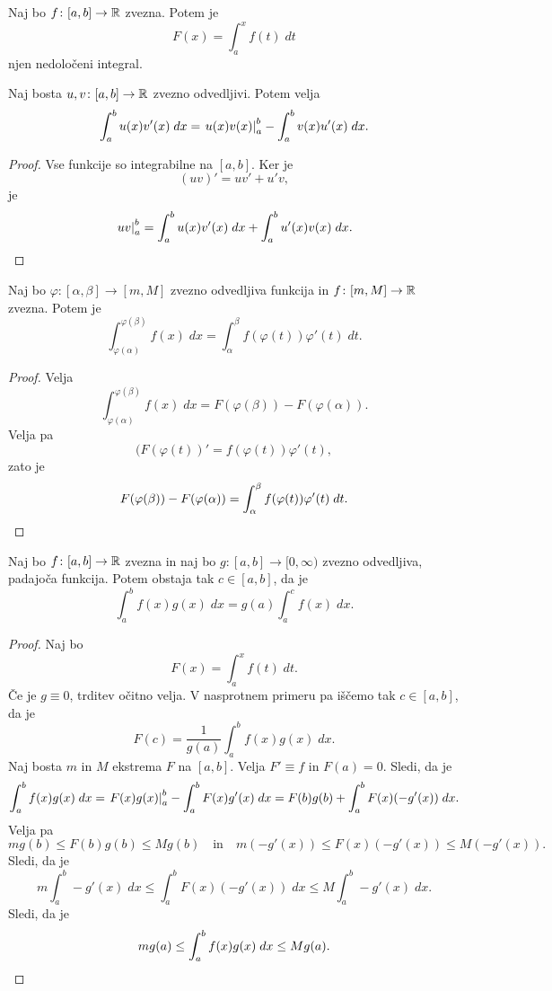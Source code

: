 \documentclass[12pt, a4paper]{article}
\begin{document}
\begin{posledica}
Naj bo $f\colon[a,b]\to\mathbb{R}$ zvezna. Potem je
\[
F(x)=\int_a^x f(t)\;dt
\]
njen nedoločeni integral.
\end{posledica}

\begin{trditev}
Naj bosta $u,v\colon[a,b]\to\mathbb{R}$ zvezno odvedljivi. Potem velja
\[
\int_a^b u(x)v'(x)\;dx=\left. u(x)v(x)\right|_{a}^{b}-\int_a^b v(x)u'(x)\;dx.
\]
\end{trditev}

\begin{proof}
Vse funkcije so integrabilne na $[a,b]$. Ker je
\[
(uv)'=uv'+u'v,
\]
je
\[
\left. uv\right|_{a}^{b}=\int_a^bu(x)v'(x)\;dx + \int_a^bu'(x)v(x)\;dx.\qedhere
\]
\end{proof}

\begin{trditev}
Naj bo $\varphi\colon[\alpha,\beta]\to[m,M]$ zvezno odvedljiva funkcija in $f\colon[m,M]\to\mathbb{R}$ zvezna. Potem je
\[
\int_{\varphi(\alpha)}^{\varphi(\beta)} f(x)\;dx = \int_\alpha^\beta f(\varphi(t))\varphi'(t)\;dt.
\]
\end{trditev}

\begin{proof}
Velja
\[
\int_{\varphi(\alpha)}^{\varphi(\beta)} f(x)\;dx =F(\varphi(\beta))-F(\varphi(\alpha)).
\]
Velja pa
\[
(F(\varphi(t))'=f(\varphi(t))\varphi'(t),
\]
zato je
\[
F(\varphi(\beta))-F(\varphi(\alpha))=\int_\alpha^\beta f(\varphi(t))\varphi'(t)\;dt.\qedhere
\]
\end{proof}

\begin{izrek}
Naj bo $f\colon[a,b]\to\mathbb{R}$ zvezna in naj bo $g\colon[a,b]\to[0,\infty)$ zvezno odvedljiva, padajoča funkcija. Potem obstaja tak $c\in[a,b]$, da je
\[
\int_a^b f(x)g(x)\;dx=g(a)\int_a^cf(x)\;dx.
\]
\end{izrek}

\begin{proof}
Naj bo
\[
F(x)=\int_a^x f(t)\;dt.
\]
Če je $g\equiv 0$, trditev očitno velja. V nasprotnem primeru pa iščemo tak $c\in[a,b]$, da je
\[
F(c)=\frac{1}{g(a)}\int_a^bf(x)g(x)\;dx.
\]
Naj bosta $m$ in $M$ ekstrema $F$ na $[a,b]$. Velja $F'\equiv f$ in $F(a)=0$. Sledi, da je
\[
\int_a^bf(x)g(x)\;dx=\left. F(x)g(x)\right|_{a}^{b}-\int_a^b F(x)g'(x)\;dx=F(b)g(b)+\int_a^b F(x)(-g'(x))\;dx.
\]
Velja pa
\[
mg(b)\leq F(b)g(b)\leq Mg(b)\quad\text{in}\quad m(-g'(x))\leq F(x)(-g'(x))\leq M(-g'(x)).
\]
Sledi, da je
\[
m\int_a^b-g'(x)\;dx\leq \int_a^b F(x)(-g'(x))\;dx\leq M\int_a^b-g'(x)\;dx.
\]
Sledi, da je
\[
mg(a)\leq \int_a^bf(x)g(x)\;dx\leq Mg(a).\qedhere
\]
\end{proof}
\end{document}

